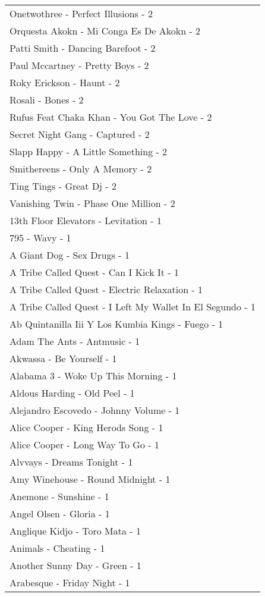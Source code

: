 \documentclass[
]{article}
\begin{document}
\begin{longtable}{l}
Onetwothree - Perfect Illusions - 2 \\ 
Orquesta Akokn - Mi Conga Es De Akokn - 2 \\ 
Patti Smith - Dancing Barefoot - 2 \\ 
Paul Mccartney - Pretty Boys - 2 \\ 
Roky Erickson - Haunt - 2 \\ 
Rosali - Bones - 2 \\ 
Rufus Feat Chaka Khan - You Got The Love - 2 \\ 
Secret Night Gang - Captured - 2 \\ 
Slapp Happy - A Little Something - 2 \\ 
Smithereens - Only A Memory - 2 \\ 
Ting Tings - Great Dj - 2 \\ 
Vanishing Twin - Phase One Million - 2 \\ 
13th Floor Elevators - Levitation - 1 \\ 
795 - Wavy - 1 \\ 
A Giant Dog - Sex Drugs - 1 \\ 
A Tribe Called Quest - Can I Kick It - 1 \\ 
A Tribe Called Quest - Electric Relaxation - 1 \\ 
A Tribe Called Quest - I Left My Wallet In El Segundo - 1 \\ 
Ab Quintanilla Iii Y Los Kumbia Kings - Fuego - 1 \\ 
Adam The Ants - Antmusic - 1 \\ 
Akwassa - Be Yourself - 1 \\ 
Alabama 3 - Woke Up This Morning - 1 \\ 
Aldous Harding - Old Peel - 1 \\ 
Alejandro Escovedo - Johnny Volume - 1 \\ 
Alice Cooper - King Herods Song - 1 \\ 
Alice Cooper - Long Way To Go - 1 \\ 
Alvvays - Dreams Tonight - 1 \\ 
Amy Winehouse - Round Midnight - 1 \\ 
Anemone - Sunshine - 1 \\ 
Angel Olsen - Gloria - 1 \\ 
Anglique Kidjo - Toro Mata - 1 \\ 
Animals - Cheating - 1 \\ 
Another Sunny Day - Green - 1 \\ 
Arabesque - Friday Night - 1 \\ 

\end{longtable}
\end{document}
